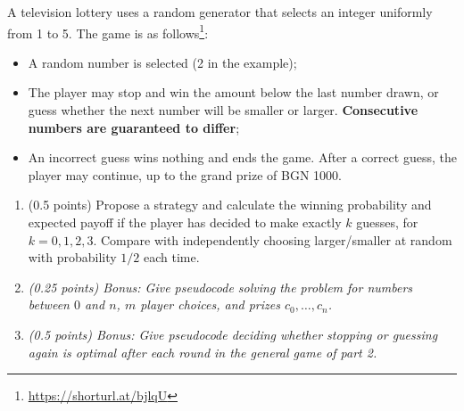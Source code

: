 \documentclass[a4paper]{report}
\begin{document}
\begin{problem}
A television lottery uses a random generator that selects an integer uniformly from 1 to 5. The game is as follows\footnote{\href{https://shorturl.at/bjlqU}{https://shorturl.at/bjlqU}}:
\begin{itemize}
    \item A random number is selected (2 in the example);
    \item The player may stop and win the amount below
    the last number drawn, or guess whether the next
    number will be smaller or larger. \textbf{Consecutive
    numbers are guaranteed to differ};
    \item An incorrect guess wins nothing and ends the game. After a correct guess,
    the player may continue, up to the grand prize of BGN 1000.
\end{itemize}


\begin{center}
\end{center}


\begin{enumerate}
    \item (0.5 points) Propose a strategy and calculate the winning probability and expected payoff if the player
    has decided to make exactly $k$ guesses, for $k=0,1,2,3$. Compare with independently choosing larger/smaller at random
    with probability $1/2$ each time.

    \item \textit{(0.25 points) Bonus: Give pseudocode solving the problem for numbers
    between $0$ and $n$, $m$ player choices, and prizes $c_0,\dots,c_n$.}

    \item \textit{(0.5 points) Bonus: Give pseudocode deciding whether
    stopping or guessing again is optimal after each round in the general game of part 2.}

\end{enumerate}




\end{problem}
\end{document}
